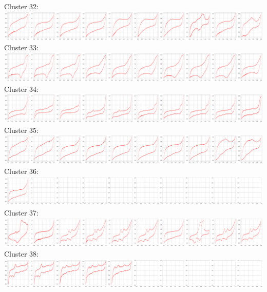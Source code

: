 Cluster 32:\\
\includegraphics[width=1.0\textwidth]{figures/clusters/cv_cluster32.png}
Cluster 33:\\
\includegraphics[width=1.0\textwidth]{figures/clusters/cv_cluster33.png}
Cluster 34:\\
\includegraphics[width=1.0\textwidth]{figures/clusters/cv_cluster34.png}
Cluster 35:\\
\includegraphics[width=1.0\textwidth]{figures/clusters/cv_cluster35.png}
Cluster 36:\\
\includegraphics[width=1.0\textwidth]{figures/clusters/cv_cluster36.png}
Cluster 37:\\
\includegraphics[width=1.0\textwidth]{figures/clusters/cv_cluster37.png}
Cluster 38:\\
\includegraphics[width=1.0\textwidth]{figures/clusters/cv_cluster38.png}